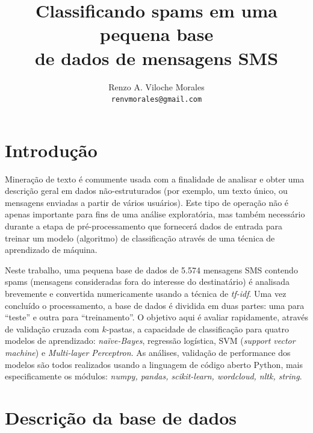 \documentclass[a4paper,11pt]{article}
\title{ Classificando spams em uma pequena base \\ de dados de mensagens SMS}
\author{Renzo A. Viloche Morales \\ \texttt{renvmorales@gmail.com}}
\begin{document}
\maketitle

\section{Introdução}

Mineração de texto é comumente usada com a finalidade de analisar e obter uma descrição geral em 
dados não-estruturados (por exemplo, um texto único, ou mensagens enviadas a partir de vários 
usuários). Este tipo de operação não é apenas importante para fins de uma análise exploratória, 
mas também necessário durante a etapa de pré-processamento que fornecerá dados de entrada para 
treinar um modelo (algoritmo) de classificação através de uma técnica de aprendizado de máquina. 

Neste trabalho, uma pequena base de dados de 5.574 mensagens SMS contendo spams (mensagens 
consideradas fora do interesse do destinatário) é analisada brevemente e convertida numericamente 
usando a técnica de \textit{tf-idf}. Uma vez concluído o processamento, a base de dados é dividida 
em duas partes: uma para ``teste'' e outra para ``treinamento''. O objetivo aqui é avaliar 
rapidamente, através de validação cruzada com $k$-pastas, a capacidade de classificação para 
quatro modelos de aprendizado: \textit{naïve-Bayes}, regressão logística, SVM (\textit{support 
vector machine}) e \textit{Multi-layer Perceptron}. As análises, validação de performance dos 
modelos são todos realizados usando a linguagem de código aberto Python, mais especificamente os 
módulos: \textit{numpy, pandas, scikit-learn, wordcloud, nltk, string}.







\section{Descrição da base de dados}
\end{document}

